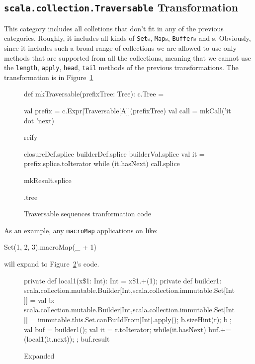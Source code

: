 \subsection{\texttt{scala.collection.Traversable} Transformation}

This category includes all colletions that don't fit in any of the previous
categories. Roughly, it includes all kinds of \texttt{Set}s, \texttt{Map}s, \texttt{Buffer}s and
s. Obviously, since it includes such a broad range of
collections we are allowed to use only methods that are supported from all the
collections, meaning that we cannot use the \texttt{length}, \texttt{apply}, \texttt{head}, \texttt{tail} methods of the
previous transformations. The transformation is in Figure~\ref{trav_transf} 

\begin{figure}
\begin{scalaCode}
 def mkTraversable(prefixTree: Tree): c.Tree = {
  val prefix = c.Expr[Traversable[A]](prefixTree)
  val call   = mkCall('it dot 'next)

  reify {
    closureDef.splice
    builderDef.splice
    builderVal.splice
    val it = prefix.splice.toIterator
    while (it.hasNext)
      call.splice

    mkResult.splice
  }.tree
}
\end{scalaCode}
\caption[Traversable sequences tranformation code]{Traversable sequences tranformation code}
\label{trav_transf}
\end{figure}

As an
example, any \texttt{macroMap} applications on  like:

\begin{scalaCode}
Set(1, 2, 3).macroMap(\_ + 1)
\end{scalaCode}
will expand to Figure~\ref{set_expansion}'s code.

\begin{figure}
\begin{scalaCode}
{
  private def local1(x\$1: Int): Int = x\$1.+(1);
  private def builder1:
scala.collection.mutable.Builder[Int,scala.collection.immutable.Set[Int]] = {
    val b:
scala.collection.mutable.Builder[Int,scala.collection.immutable.Set[Int]] =
immutable.this.Set.canBuildFrom[Int].apply();
    b.sizeHint(r);
    b
  };
  val buf = builder1();
  val it = r.toIterator;
  while(it.hasNext){
    buf.+=(local1(it.next));
  };
  buf.result
}
\end{scalaCode}
\caption[Expanded ]{Expanded }
\label{set_expansion}
\end{figure}

